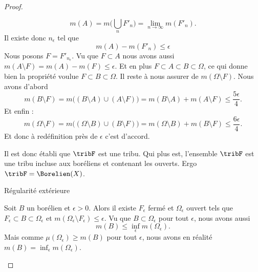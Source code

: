 \begin{proof}
\begin{subproof}
\begin{subproof}
                    \begin{equation}
                        m(A)=m\big( \bigcup_nF'_n \big)=\lim_{n\to \infty} m(F'_n).
                    \end{equation}
                    Il existe donc \( n_{\epsilon}\) tel que 
                    \begin{equation}
                        m(A)-m(F'_{n})\leq \epsilon
                    \end{equation}
                    Nous posons \( F=F'_{n_{\epsilon}}\). Vu que \( F\subset A\) nous avons aussi \( m(A\setminus F)=m(A)-m(F)\leq \epsilon\). Et en plus \( F\subset A\subset B\subset \Omega\), ce qui donne bien la propriété voulue \( F\subset B\subset \Omega\). Il reste à nous assurer de \( m(\Omega\setminus F)\). Nous avons d'abord
                    \begin{equation}
                        m(B\setminus F)=m\big( (B\setminus A)\cup (A\setminus F) \big)=m(B\setminus A)+m(A\setminus F)\leq \frac{ 5\epsilon }{ 4 }.
                    \end{equation}
                    Et enfin :
                    \begin{equation}
                        m(\Omega\setminus F)=m\big( (\Omega\setminus B)\cup (B\setminus F) \big)=m(\Omega\setminus B)+m(B\setminus F)\leq \frac{ 6\epsilon }{ 4 }.
                    \end{equation}
                    Et donc à redéfinition près de \( \epsilon\) c'est d'accord. 
                    
                \end{subproof}

                Il est donc établi que \( \tribF\) est une tribu. Qui plus est, l'ensemble \( \tribF\) est une tribu incluse aux boréliens et contenant les ouverts. Ergo \( \tribF=\Borelien(X)\).

            \item[Régularité extérieure] 

                Soit \( B\) un borélien et \( \epsilon>0\). Alors il existe \( F_{\epsilon}\) fermé et \( \Omega_{\epsilon} \) ouvert tels que \( F_{\epsilon}\subset B\subset \Omega_{\epsilon}\) et \( m(\Omega_{\epsilon}\setminus F_{\epsilon})\leq \epsilon\). Vu que \( B\subset \Omega_{\epsilon}\) pour tout \( \epsilon\), nous avons aussi
                \begin{equation}
                    m(B)\leq \inf_{\epsilon}m(\Omega_{\epsilon}).
                \end{equation}
                Mais comme \( \mu(\Omega_{\epsilon})\geq m(B)\) pour tout \( \epsilon\), nous avons en réalité \( m(B)=\inf_{\epsilon}m(\Omega_{\epsilon})\).
                

\end{subproof}
\end{proof}
